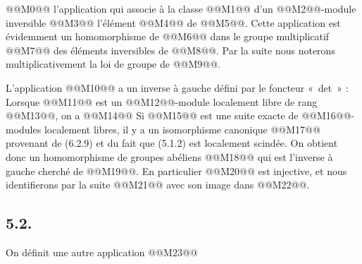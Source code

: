 
@@M0@@
l'application qui associe à la classe @@M1@@ d'un @@M2@@-module inversible @@M3@@ l'élément @@M4@@ de @@M5@@. Cette application est évidemment un homomorphisme de @@M6@@ dans le groupe multiplicatif @@M7@@ des éléments inversibles de @@M8@@. Par la suite nous noterons multiplicativement la loi de groupe de @@M9@@.

L'application @@M10@@ a un inverse à gauche défini par le foncteur «~det~» : Lorsque @@M11@@ est un @@M12@@-module localement libre de rang @@M13@@, on a
@@M14@@
Si
@@M15@@
est une suite exacte de @@M16@@-modules localement libres, il y a un isomorphisme canonique
@@M17@@
provenant de (6.2.9) et du fait que (5.1.2) est localement scindée. On obtient donc un homomorphisme de groupes abéliens
@@M18@@
qui est l'inverse à gauche cherché de @@M19@@. En particulier @@M20@@ est injective, et nous identifierons par la suite @@M21@@ avec son image dans @@M22@@.

\subsection*{5.2.}
On définit une autre application
@@M23@@

